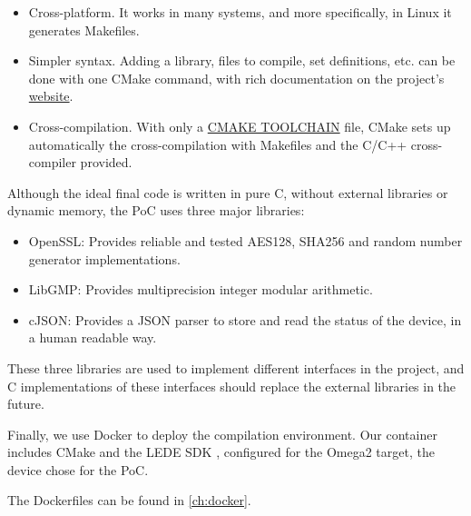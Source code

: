 \begin{itemize}
	\item Cross-platform. It works in many systems, and more specifically, in Linux it generates Makefiles.
	\item Simpler syntax. Adding a library, files to compile, set definitions, etc. can be done with one CMake command, with rich documentation on the project's \href{https://cmake.org/cmake/help/latest/}{website}.
	\item Cross-compilation. With only a \href{http://www.vtk.org/Wiki/CMake_Cross_Compiling#The_toolchain_file}{\small{CMAKE TOOLCHAIN}} file, CMake sets up automatically the cross-compilation with Makefiles and the C/C++ cross-compiler provided.
\end{itemize}


\hfil

Although the ideal final code is written in pure C, without external libraries or dynamic memory, the PoC uses three major libraries:

\begin{itemize}
	\item OpenSSL: Provides reliable and tested AES128, SHA256 and random number generator implementations.
	\item LibGMP: Provides multiprecision integer modular arithmetic.
	\item cJSON: Provides a JSON parser to store and read the status of the device, in a human readable way.
\end{itemize}

These three libraries are used to implement different interfaces in the project, and C implementations of these interfaces should replace the external libraries in the future.

\hfil

Finally, we use Docker to deploy the compilation environment. Our container includes CMake and the LEDE SDK \citep{ledeproject}, configured for the Omega2 target, the device chose for the PoC.

The Dockerfiles can be found in \autoref{ch:docker}.
